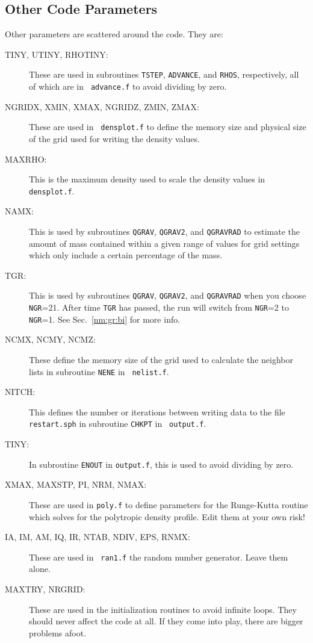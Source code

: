 \subsection{Other Code Parameters}
Other parameters are scattered around the code.  They are:
\begin{description}
\item[TINY, UTINY, RHOTINY:] These are used in subroutines {\tt TSTEP},
{\tt ADVANCE}, and {\tt RHOS}, respectively, all of which are in {\tt
advance.f} to avoid dividing by zero.
\item[NGRIDX, XMIN, XMAX, NGRIDZ, ZMIN, ZMAX:] These are used in {\tt
densplot.f} to define the memory size and physical size of the grid
used for writing the density values.
\item[MAXRHO:] This is the maximum density used to scale the density
values in {\tt densplot.f}.
\item[NAMX:] This is used by subroutines {\tt QGRAV}, {\tt QGRAV2}, and
{\tt QGRAVRAD} to estimate the amount of mass contained within a given
range of values for grid settings which only include a certain
percentage of the mass.
\item[TGR:] This is used by subroutines {\tt QGRAV}, {\tt QGRAV2}, and
{\tt QGRAVRAD} when you choose {\tt NGR}=21.  After time {\tt TGR} has 
passed, the run will switch from {\tt NGR}=2 to {\tt NGR}=1.  
See Sec.~\ref{nm:gr:bi} for more info.
\item[NCMX, NCMY, NCMZ:] These define the memory size of the grid used
to calculate the neighbor lists in subroutine {\tt NENE} in {\tt
nelist.f}.
\item[NITCH:] This defines the number or iterations between writing
data to the file {\tt restart.sph} in subroutine {\tt CHKPT} in {\tt
output.f}.
\item[TINY:] In subroutine {\tt ENOUT} in {\tt output.f}, this is used
to avoid dividing by zero.
\item[XMAX, MAXSTP, PI, NRM, NMAX:] These are used in {\tt poly.f} to define
parameters for the Runge-Kutta routine which solves for the polytropic
density profile.  Edit them at your own risk!
\item[IA, IM, AM, IQ, IR, NTAB, NDIV, EPS, RNMX:] These are used in {\tt
ran1.f} the random number generator.  Leave them alone.
\item[MAXTRY, NRGRID:] These are used in the initialization routines to
avoid infinite loops.  They should never affect the code at all.  If
they come into play, there are bigger problems afoot.
\end{description}

